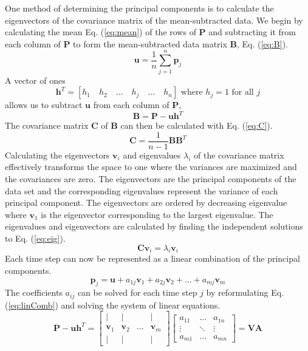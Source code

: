 One method of determining the principal components is to calculate the
eigenvectors of the covariance matrix of the mean-subtracted data. We begin by
calculating the mean Eq. (\ref{eq:mean}) of the rows of $\mathbf{P}$ and
subtracting it from each column of $\mathbf{P}$ to form the mean-subtracted
data matrix $\mathbf{B}$, Eq. (\ref{eq:B}).
\begin{equation}
    \mathbf{u}=\frac{1}{n}\sum_{j=1}^n\mathbf{p}_j
    \label{eq:mean}
\end{equation}
A vector of ones
\begin{displaymath}
    \mathbf{h}^T=\left[h_1\quad h_2\quad\ldots\quad h_j\quad\ldots\quad h_n\right]
    \textrm{ where }h_j=1\textrm{ for all }j
    \label{eq:h}
\end{displaymath}
allows us to subtract $\mathbf{u}$ from each column of $\mathbf{P}$,
\begin{equation}
    \mathbf{B}=\mathbf{P}-\mathbf{u}\mathbf{h}^T
    \label{eq:B}
\end{equation}
The covariance matrix $\mathbf{C}$ of $\mathbf{B}$ can then be calculated with
Eq. (\ref{eq:C}).
\begin{equation}
    \mathbf{C}=\frac{1}{n-1}\mathbf{B}{\mathbf{B}^T}
    \label{eq:C}
\end{equation}
Calculating the eigenvectors $\mathbf{v}_i$ and eigenvalues $\lambda_i$ of the
covariance matrix effectively transforms the space to one where the variances
are maximized and the covariances are zero. The eigenvectors are the principal
components of the data set and the corresponding eigenvalues represent the
variance of each principal component. The eigenvectors are ordered by
decreasing eigenvalue where $\mathbf{v}_1$ is the eigenvector corresponding to
the largest eigenvalue. The eigenvalues and eigenvectors are calculated by
finding the independent solutions to Eq. (\ref{eq:eig}).
\begin{equation}
    \mathbf{C}\mathbf{v}_i=\lambda_i\mathbf{v}_i
    \label{eq:eig}
\end{equation}
Each time step can now be represented as a linear combination of the principal
components.
\begin{equation}
    \mathbf{p}_j=\mathbf{u}+a_{1j}\mathbf{v}_1+a_{2j}\mathbf{v}_2+\ldots+a_{mj}\mathbf{v}_m
    \label{eq:linComb}
\end{equation}
The coefficients $a_{ij}$ can be solved for each time step $j$ by reformulating
Eq. (\ref{eq:linComb}) and solving the system of linear equations.
\begin{equation}
    \mathbf{P}-\mathbf{u}\mathbf{h}^T=
    \left[\begin{array}{cccc}
        | & | & & |\\
        \mathbf{v}_1 & \mathbf{v}_2 & \ldots & \mathbf{v}_m\\
        | & | & & |
    \end{array}\right]
    \left[\begin{array}{ccc}
    a_{11} & \ldots & a_{1n}\\
    \vdots & \ddots & \vdots\\
    a_{m1} & \ldots & a_{mn}
    \end{array}\right]
    =\mathbf{V}\mathbf{A}
\end{equation}

